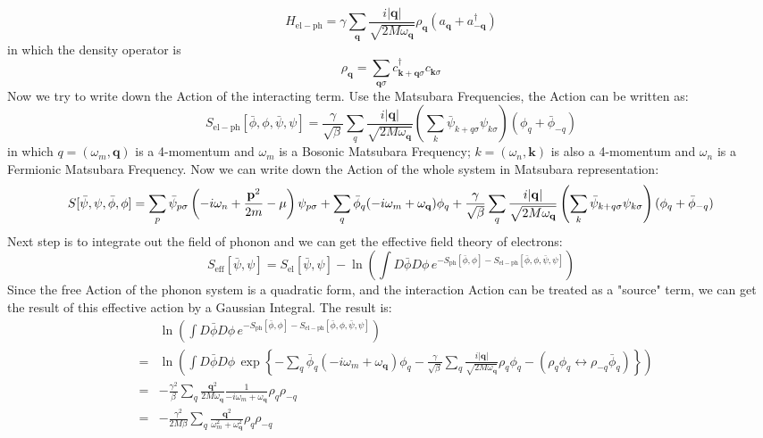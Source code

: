 \documentclass{article}
\newcommand{\mtp}{\mathbf{p}}
\newcommand{\mtq}{\mathbf{q}}
\newcommand{\mtk}{\mathbf{k}}
\begin{document}
\begin{equation}
H_{\mathrm{el-ph}} = \gamma \sum_{\mtq}\frac{i|\mtq|}{\sqrt{2M\omega_{\mtq}}} \rho_{\mtq}(a_{\mtq}+ a^\dagger_{-\mtq}) 
\end{equation}
in which the density operator is
$$
\rho_{\mtq} = \sum_{\mtq\sigma} c^\dagger_{\mtk+\mtq\sigma}c_{\mtk\sigma}
$$
Now we try to write down the Action of the interacting term. Use the Matsubara Frequencies, the Action can be written as:
\begin{equation}
S_{\mathrm{el-ph}}[\bar{\phi},\phi,\bar{\psi},\psi] = \frac{\gamma}{\sqrt{\beta}} \sum_{q}\frac{i|\mtq|}{\sqrt{2M\omega_\mtq}}\left(\sum_k \bar{\psi}_{k+q\sigma}\psi_{k\sigma} \right)(\phi_{q}+ \bar{\phi}_{-q}) 
\end{equation}
in which $q = (\omega_m, \mtq)$ is a 4-momentum and $\omega_m$ is a Bosonic Matsubara Frequency; $k = (\omega_n,\mtk)$ is also a 4-momentum and $\omega_n$ is a Fermionic Matsubara Frequency. Now we can write down the Action of the whole system in Matsubara representation:
\begin{equation}
S[\bar{\psi},\psi,\bar{\phi},\phi] = \sum_{p}\bar{\psi}_{p\sigma}\left(-i\omega_n +\frac{\mtp^2}{2m}-\mu\right)\psi_{p\sigma} + \sum_q \bar{\phi}_q(-i\omega_m+\omega_\mtq)\phi_q + {\gamma\over{\sqrt{\beta}}} \sum_{q}\frac{i|\mtq|}{\sqrt{2M\omega_\mtq}}\left(\sum_k \bar{\psi}_{k+q\sigma}\psi_{k\sigma} \right)(\phi_{q}+ \bar{\phi}_{-q}) 
\end{equation}
Next step is to integrate out the field of phonon and we can get the effective field theory of electrons:
\begin{equation}
S_{\mathrm{eff}}[\bar{\psi},\psi] = S_{\mathrm{el}}[\bar{\psi},\psi] - \ln{\left(\int D\bar{\phi}D\phi\,e^{-S_{\mathrm{ph}}[\bar{\phi},\phi]-S_{\mathrm{el-ph}}[\bar{\phi},\phi,\bar{\psi},\psi]}\right)}
\end{equation}
Since the free Action of the phonon system is a quadratic form, and the interaction Action can be treated as a "source" term, we can get the result of this effective action by a Gaussian Integral. The result is:
\begin{eqnarray}
& & \ln\left(\int D\bar\phi D\phi\,e^{-S_{\mathrm{ph}}[\bar{\phi},\phi]-S_{\mathrm{el-ph}}[\bar{\phi},\phi,\bar{\psi},\psi]}\right)\nonumber\\
&=& \ln\left(\int D\bar\phi D\phi\, \exp\left\{- \sum_q \bar{\phi}_q(-i\omega_m+\omega_\mtq)\phi_q - \frac{\gamma}{\sqrt{\beta}}\sum_q \frac{i|\mtq|}{\sqrt{2M\omega_\mtq}}\rho_q\phi_q - (\rho_q\phi_q\leftrightarrow\rho_{-q}\bar{\phi}_{q}) \right\}\right)\nonumber\\
&=& - \frac{\gamma^2}{\beta} \sum_q \frac{\mtq^2}{2M\omega_\mtq}\frac{1}{-i\omega_m+ \omega_\mtq}\rho_q\rho_{-q}\nonumber\\
&=& -\frac{\gamma^2}{2M\beta}\sum_q \frac{\mtq^2}{\omega_m^2 + \omega_\mtq^2}\rho_q\rho_{-q}
\end{eqnarray}
\end{document}

